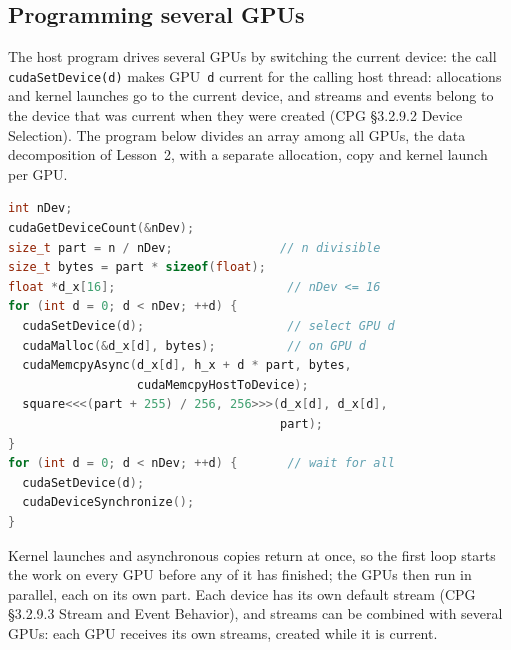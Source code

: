 \documentclass[../main.tex]{subfiles}
\begin{document}
\subsection{Programming several GPUs}

The host program drives several GPUs by switching the current device:
the call \texttt{cudaSetDevice(d)} makes GPU~\texttt{d} current for the calling
host thread: allocations and kernel launches go to the current device,
and streams and events belong to the device that was current when they
were created (CPG §3.2.9.2 Device Selection).  The program below divides
an array among all GPUs, the data decomposition of Lesson~2, with a
separate allocation, copy and kernel launch per GPU.

\begin{lstlisting}[language=C++, numbers=none]
int nDev;
cudaGetDeviceCount(&nDev);
size_t part = n / nDev;               // n divisible
size_t bytes = part * sizeof(float);
float *d_x[16];                        // nDev <= 16
for (int d = 0; d < nDev; ++d) {
  cudaSetDevice(d);                    // select GPU d
  cudaMalloc(&d_x[d], bytes);          // on GPU d
  cudaMemcpyAsync(d_x[d], h_x + d * part, bytes,
                  cudaMemcpyHostToDevice);
  square<<<(part + 255) / 256, 256>>>(d_x[d], d_x[d],
                                      part);
}
for (int d = 0; d < nDev; ++d) {       // wait for all
  cudaSetDevice(d);
  cudaDeviceSynchronize();
}
\end{lstlisting}

%
Kernel launches and asynchronous copies return at once, so the first
loop starts the work on every GPU before any of it has finished; the GPUs
then run in parallel, each on its own part.  Each device has its own default
stream (CPG §3.2.9.3 Stream and Event Behavior), and streams can be
combined with several GPUs: each GPU receives its own streams, created
while it is current.
\end{document}
